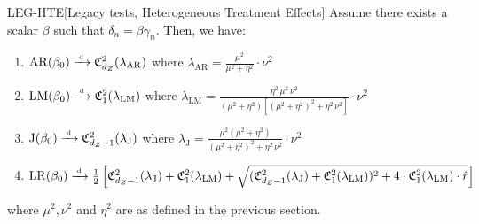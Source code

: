 \begin{lemmap}{LEG-HTE}[Legacy tests, Heterogeneous Treatment Effects]\label{lem:leg-hte}
Assume there exists a scalar \(\beta\) such that \(\delta_n=\beta \gamma_n\). Then, we have:
    \begin{enumerate}
        \item
        \(\mathrm{AR}(\beta_0)\xrightarrow{{\scriptscriptstyle \mathrm{\;d\;}}} \mathfrak{C}^2_{d_Z}(\lambda_{\mathrm{AR}})\)  where \(\lambda_{\mathrm{AR}} = \frac{\mu^2}{\mu^2+\eta^2} \cdot \nu^2\)
        \item
        \(\mathrm{LM}(\beta_0)\xrightarrow{{\scriptscriptstyle \mathrm{\;d\;}}} \mathfrak{C}^2_1(\lambda_{\mathrm{LM}})\) where \(\lambda_{\mathrm{LM}} = \frac{\eta^2\,\mu^2\,\nu^2}{(\mu^2+\eta^2)[(\mu^2+\eta^2)^2 + \eta^2\,\nu^2]} \cdot \nu^2\)
        \item
        \(\mathrm{J}(\beta_0)\xrightarrow{{\scriptscriptstyle \mathrm{\;d\;}}} \mathfrak{C}^2_{d_Z-1}(\lambda_{\mathrm{J}})\)  where \(\lambda_{\mathrm{J}} = \frac{\mu^2(\mu^2+\eta^2)}{(\mu^2+\eta^2)^2 + \eta^2\,\nu^2} \cdot \nu^2\)
        \item
        \(\mathrm{LR}(\beta_0)\xrightarrow{{\scriptscriptstyle \mathrm{\;d\;}}} \frac{1}{2}\left[\mathfrak{C}^2_{d_Z-1}(\lambda_{\mathrm{J}})+\mathfrak{C}^2_1(\lambda_{\mathrm{LM}}) + \sqrt{(\mathfrak{C}^2_{d_Z-1}(\lambda_{\mathrm{J}})+\mathfrak{C}^2_1(\lambda_{\mathrm{LM}}))^2 + 4 \cdot \mathfrak{C}^2_1(\lambda_{\mathrm{LM}}) \cdot \hat r} \right]\)
    \end{enumerate}
    \noindent
where \(\mu^2,\nu^2\) and \(\eta^2\) are as defined in the previous section.
\end{lemmap}
